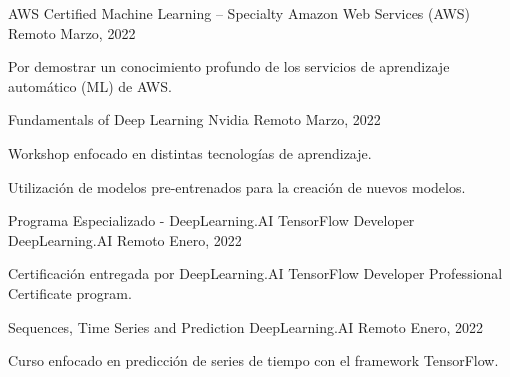 

\begin{cventries}
  \cventry
  {AWS Certified Machine Learning – Specialty} %
  {Amazon Web Services (AWS)} %
  {Remoto} %
  {Marzo, 2022} %
  {
    \begin{cvitems} %
      \item {Por demostrar un conocimiento profundo de los servicios de aprendizaje automático (ML) de AWS.}
    \end{cvitems}
  } %
  \newline
  \cventry
  {Fundamentals of Deep Learning} %
  {Nvidia} %
  {Remoto} %
  {Marzo, 2022} %
  {
    \begin{cvitems} %
      \item {Workshop enfocado en distintas tecnologías de aprendizaje.}
      \item {Utilización de modelos pre-entrenados para la creación de nuevos modelos.}
    \end{cvitems}
  } %
  \newline
  \cventry
  {Programa Especializado - DeepLearning.AI TensorFlow Developer} %
  {DeepLearning.AI} %
  {Remoto} %
  {Enero, 2022} %
  {
    \begin{cvitems} %
      \item {Certificación entregada por DeepLearning.AI TensorFlow Developer Professional Certificate program.}
    \end{cvitems}
  }
  \newline
  \cventry
  {Sequences, Time Series and Prediction} %
  {DeepLearning.AI} %
  {Remoto} %
  {Enero, 2022} %
  {
    \begin{cvitems} %
      \item {Curso enfocado en predicción de series de tiempo con el framework TensorFlow.}

\end{cvitems}}
\end{cventries}

